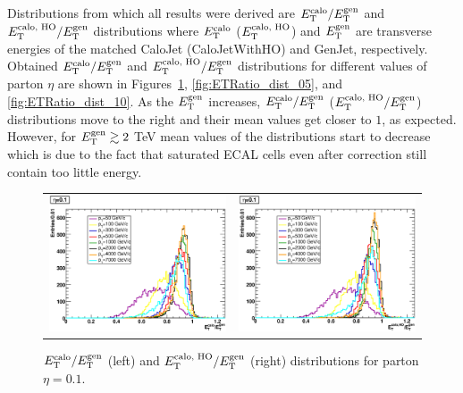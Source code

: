 \documentclass{cmspaper}
\begin{document}
Distributions from which all results were derived are $E^\text{calo}_\text T/E^\text{gen}_\text T$  and $E^\text{calo, HO}_\text T/E^\text{gen}_\text T$ distributions where $E^\text{calo}_\text T$ ($E^\text{calo, HO}_\text T$) and $E^\text{gen}_\text T$ are transverse energies of the matched CaloJet (CaloJetWithHO) and GenJet, respectively. Obtained $E^\text{calo}_\text T/E^\text{gen}_\text T$ and $E^\text{calo, HO}_\text T/E^\text{gen}_\text T$ distributions for different values of parton $\eta$ are shown in Figures~\ref{fig:ETRatio_dist_01}, \ref{fig:ETRatio_dist_05}, and \ref{fig:ETRatio_dist_10}. As the $E^\text{gen}_\text T$ increases, $E^\text{calo}_\text T/E^\text{gen}_\text T$ ($E^\text{calo, HO}_\text T/E^\text{gen}_\text T$) distributions move to the right and their mean values get closer to $1$, as expected. However, for $E^\text{gen}_\text T\gtrsim2$ TeV mean values of the distributions start to decrease which is due to the fact that saturated ECAL cells even after correction still contain too little energy.
\begin{figure}
 \centering
 \begin{tabular}{ll}
  \includegraphics[width=3in]{figs/h_ETRatio_ET_py_corr_eta0.1.eps} &
  \includegraphics[width=3in]{figs/h_ETRatioWithHO_ET_py_corr_eta0.1.eps} \\
 \end{tabular}
 \caption{$E^\text{calo}_\text T/E^\text{gen}_\text T$ (left) and $E^\text{calo, HO}_\text T/E^\text{gen}_\text T$ (right) distributions for parton $\eta=0.1$.}
 \label{fig:ETRatio_dist_01}
\end{figure}
\end{document}
